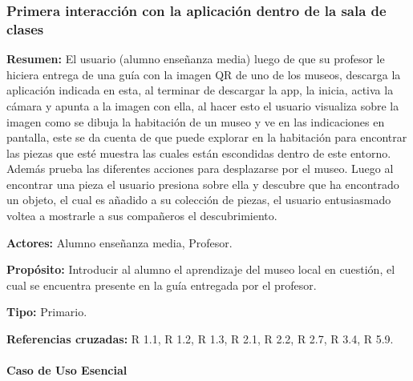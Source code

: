 \subsubsection{Primera interacción con la aplicación dentro de la sala de clases}

{\textbf {Resumen:}}
El usuario (alumno enseñanza media) luego de que su profesor le hiciera entrega de una guía con la imagen QR de uno de los museos, descarga la aplicación indicada en esta, al terminar de descargar la app, la inicia, activa la cámara y apunta a la imagen con ella, al hacer esto el usuario visualiza sobre la imagen como se dibuja la habitación de un museo y ve en las indicaciones en pantalla, este se da cuenta de que puede explorar en la habitación para encontrar las piezas que esté muestra las cuales están escondidas dentro de este entorno. Además prueba las diferentes acciones para desplazarse por el museo. Luego al encontrar una pieza el usuario presiona sobre ella y descubre que ha encontrado un objeto, el cual es añadido a su colección de piezas, el usuario entusiasmado voltea a mostrarle a sus compañeros el descubrimiento.

{\textbf {Actores:}}
Alumno enseñanza media, Profesor.

{\textbf {Propósito:}}
Introducir al alumno el aprendizaje del museo local en cuestión, el cual se encuentra presente en la guía entregada por el profesor.

{\textbf {Tipo:}}
Primario.

{\textbf {Referencias cruzadas:}}
R 1.1, R 1.2, R 1.3, R 2.1, R 2.2, R 2.7, R 3.4, R 5.9.

\paragraph{Caso de Uso Esencial}

